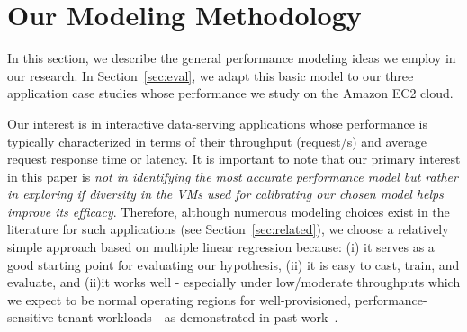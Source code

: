 \section{Our Modeling Methodology}
\label{sec:model}
\vspace{10pt}

In this section, we describe the general performance modeling ideas we employ in our research. In Section~\ref{sec:eval}, %
we adapt this basic model to our three application case studies whose performance we study on the Amazon EC2 cloud. 

Our interest is in interactive data-serving applications whose %
performance is typically %
characterized in terms of their throughput (request/s) and average request response time or latency.  %
 It is important to note that our primary interest in this paper is {\em not in identifying the most accurate performance model but rather in exploring if diversity in the VMs used for calibrating our chosen model helps improve its efficacy}. 
Therefore, although numerous modeling choices exist in the literature for such applications (see Section~\ref{sec:related}), we choose a relatively simple approach based on multiple linear regression because: (i) it serves as a good starting point for evaluating our hypothesis, (ii) it is easy to cast, train, and evaluate, and (ii)it  works well - especially under low/moderate throughputs which we expect to be normal operating regions for well-provisioned, performance-sensitive tenant workloads -  as demonstrated in past work~\cite{Stewart07,Kelly:2005:DPA:1251522.1251530}. 



